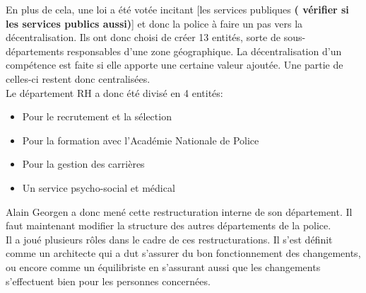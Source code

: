 \documentclass[12pt]{article}
\begin{document}
En plus de cela, une loi a été votée incitant [les services publiques \textbf{( vérifier si les services publics aussi)}] et donc la police à faire un pas vers la décentralisation. Ils ont donc choisi de créer 13 entités, sorte de sous-départements responsables d'une zone géographique. La décentralisation d'un compétence est faite si elle apporte une certaine valeur ajoutée. Une partie de celles-ci restent donc centralisées.\\

Le département RH a donc été divisé en 4 entités:
\begin{itemize}
	\item Pour le recrutement et la sélection
	\item Pour la formation avec l'Académie Nationale de Police
	\item Pour la gestion des carrières
	\item Un service psycho-social et médical
\end{itemize}

Alain Georgen a donc mené cette restructuration interne de son département. Il faut maintenant modifier la structure des autres départements de la police.\\

Il a joué plusieurs rôles dans le cadre de ces restructurations. Il s'est définit comme un architecte qui a dut s'assurer du bon fonctionnement des changements, ou encore comme un équilibriste en s'assurant aussi que les changements s'effectuent bien pour les personnes concernées.

\end{document}
